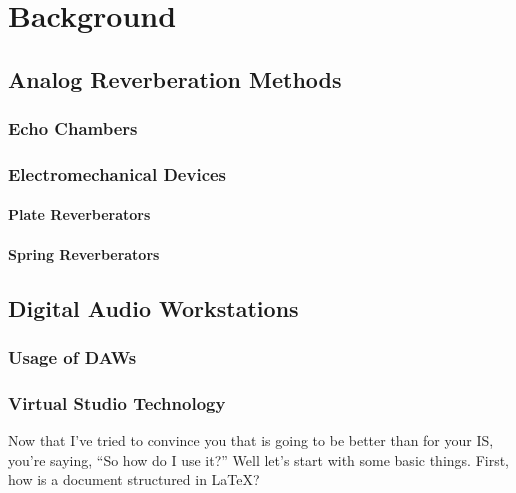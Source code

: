 \chapter{Background}
\section{Analog Reverberation Methods}
\subsection{Echo Chambers}
\subsection{Electromechanical Devices}
\subsubsection{Plate Reverberators}
\subsubsection{Spring Reverberators}
\section{Digital Audio Workstations}
\subsection{Usage of DAWs}
\subsection{Virtual Studio Technology}
Now that I've tried to convince you that \lt is going to be better than \msw for your IS, you're saying, ``So how do I use it?'' Well let's start with some basic things. First, how is a document structured in \LaTeX \citet{ophs03}?

